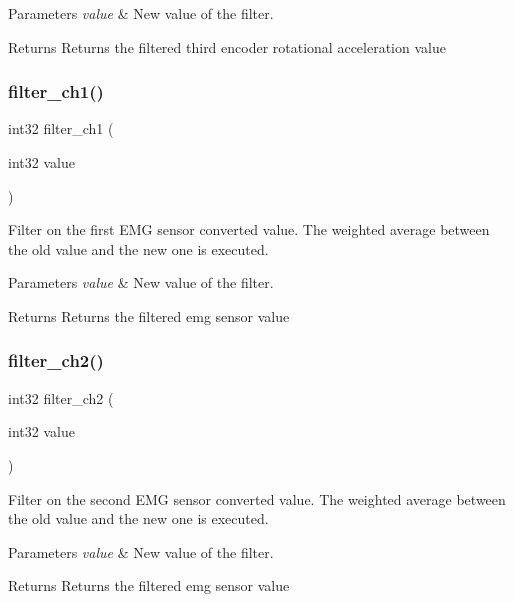 \begin{DoxyParams}{Parameters}
{\em value} & New value of the filter.\\
\hline
\end{DoxyParams}
\begin{DoxyReturn}{Returns}
Returns the filtered third encoder rotational acceleration value 
\end{DoxyReturn}
\mbox{\label{utils_8c_a9bed4948a884d80dc0d3511648e8eef3}} 
\subsubsection{filter\+\_\+ch1()}
{\footnotesize\ttfamily int32 filter\+\_\+ch1 (\begin{DoxyParamCaption}\item[{int32}]{value }\end{DoxyParamCaption})}

Filter on the first E\+MG sensor converted value. The weighted average between the old value and the new one is executed.


\begin{DoxyParams}{Parameters}
{\em value} & New value of the filter.\\
\hline
\end{DoxyParams}
\begin{DoxyReturn}{Returns}
Returns the filtered emg sensor value 
\end{DoxyReturn}
\mbox{\label{utils_8c_a66c5359b055eac4ae46c8146a9c45730}} 
\subsubsection{filter\+\_\+ch2()}
{\footnotesize\ttfamily int32 filter\+\_\+ch2 (\begin{DoxyParamCaption}\item[{int32}]{value }\end{DoxyParamCaption})}

Filter on the second E\+MG sensor converted value. The weighted average between the old value and the new one is executed.


\begin{DoxyParams}{Parameters}
{\em value} & New value of the filter.\\
\hline
\end{DoxyParams}
\begin{DoxyReturn}{Returns}
Returns the filtered emg sensor value 
\end{DoxyReturn}
\mbox{\label{utils_8c_a72883337efd7b70b783e426c47ecf689}} 

